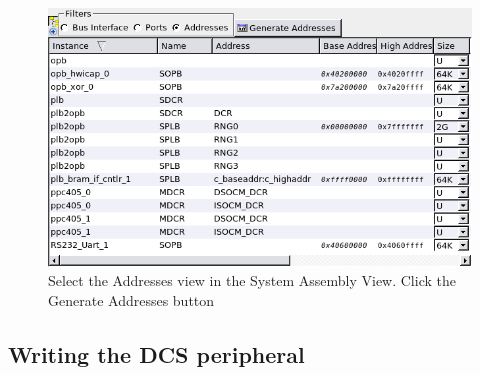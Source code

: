 \documentclass[a4paper,oneside]{memoir}
\begin{document}
\begin{figure}[H]
\centering
\includegraphics[scale=0.5]{AXOR3}
\caption{Select the Addresses view in the System Assembly View. Click the Generate Addresses button\label{fig:AXOR3}}
\end{figure}

\subsection{Writing the DCS peripheral}
\end{document}
